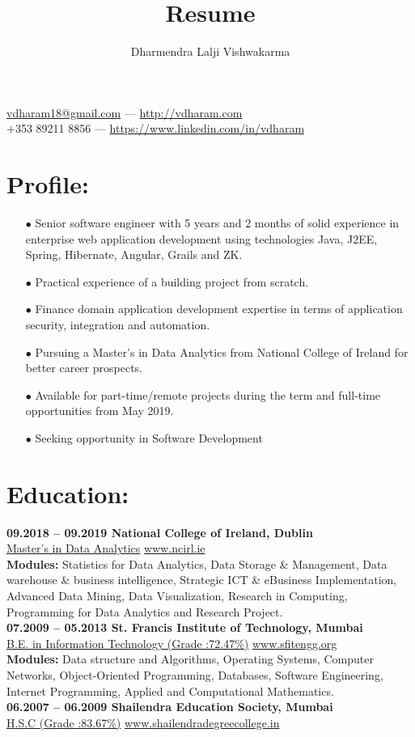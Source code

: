 \documentclass{article}
\makeatletter
\renewcommand{\maketitle}{
\begin{center}
{\LARGE\bfseries
\theauthor}

\vspace{0.25em}
\href{mailto:vdharam18@gmail.com}{vdharam18@gmail.com} --- \href{http://vdharam.com}{http://vdharam.com}
\vspace{0.25em}\\
+353 89211 8856 --- \href{https://www.linkedin.com/in/vdharam}{https://www.linkedin.com/in/vdharam}
\end{center}	
}
\makeatother
\begin{document}
\title{Resume}
\author{Dharmendra Lalji Vishwakarma}
\maketitle

\section{Profile:}
\begin{itemize}
\itemsep0em
\item[$\bullet$]
Senior software engineer with 5 years and 2 months of solid experience in enterprise web application development using technologies Java, J2EE, Spring, Hibernate, Angular, Grails and ZK.
\item[$\bullet$]
Practical experience of a building project from scratch.
\item[$\bullet$]
Finance domain application development expertise in terms of application security, integration and automation.
\item[$\bullet$]
Pursuing a Master's in Data Analytics from National College of Ireland for better career prospects.
\item[$\bullet$]
Available for part-time/remote projects during the term and full-time opportunities from May 2019.
\item[$\bullet$]
Seeking opportunity in Software Development
\end{itemize}
\section{Education:}
\textbf{09.2018 – 09.2019 \hfill National College of Ireland, Dublin\\}
\underline{Master's in Data Analytics} \hfill \href{www.ncirl.ie}{www.ncirl.ie}\\
\textbf{Modules:} Statistics for Data Analytics, Data Storage \& Management, Data warehouse \& business intelligence, Strategic ICT \& eBusiness Implementation, Advanced Data Mining, Data Visualization, Research in Computing, Programming for Data Analytics and Research Project.\hfill\\
\linebreak
\textbf{07.2009 – 05.2013 \hfill St. Francis Institute of Technology, Mumbai\\}
\underline{B.E. in Information Technology (Grade :72.47\%)} \hfill \href{www.sfitengg.org}{www.sfitengg.org} \\
\textbf{Modules:} Data structure and Algorithms, Operating Systems, Computer Networks, Object-Oriented Programming, Databases, Software Engineering, Internet Programming, Applied and Computational Mathematics.\hfill\\
\linebreak
\textbf{06.2007 – 06.2009 \hfill Shailendra Education Society, Mumbai \\}
\underline{H.S.C (Grade :83.67\%)} \hfill \href{www.shailendradegreecollege.in}{www.shailendradegreecollege.in}
\end{document}
